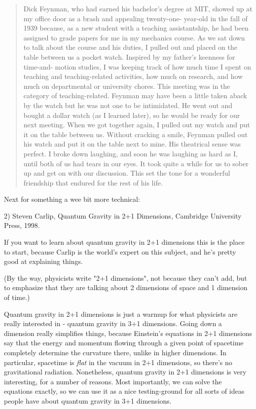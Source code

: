 \begin{quote}
     Dick Feynman, who had earned his bachelor's degree at MIT, 
     showed up at my office door as a brash and appealing twenty-one-
     year-old in the fall of 1939 because, as a new student with a
     teaching assistantship, he had been assigned to grade papers for
     me in my mechanics course.  As we sat down to talk about the course 
     and his duties, I pulled out and placed on the table between us
     a pocket watch.  Inspired by my father's keenness for time-and-
     motion studies, I was keeping track of how much time I spent on 
     teaching and teaching-related activities, how much on research, 
     and how much on departmental or university chores.  This meeting
     was in the category of teaching-related.  Feynman may have been 
     a little taken aback by the watch but he was not one to be 
     intimidated.  He went out and bought a dollar watch (as I learned
     later), so he would be ready for our next meeting.  When we got
     together again, I pulled out my watch and put it on the table 
     between us.  Without cracking a smile, Feynman pulled out his
     watch and put it on the table next to mine.  His theatrical sense
     was perfect.  I broke down laughing, and soon he was laughing as
     hard as I, until both of us had tears in our eyes.  It took quite
     a while for us to sober up and get on with our discussion.  This 
     set the tone for a wonderful friendship that endured for the rest
     of his life.
     
\end{quote}
Next for something a wee bit more technical:
    
2) Steven Carlip, Quantum Gravity in 2+1 Dimensions, Cambridge 
University Press, 1998.

If you want to learn about quantum gravity in 2+1 dimensions this is
the place to start, because Carlip is the world's expert on this subject, 
and he's pretty good at explaining things.  
 
(By the way, physicists write "2+1 dimensions", not because they can't
add, but to emphasize that they are talking about 2 dimensions of space
and 1 dimension of time.)
 
Quantum gravity in 2+1 dimensions is just a warmup for what physicists 
are really interested in - quantum gravity in 3+1 dimensions.   Going 
down a dimension really simplifies things, because Einstein's equations 
in 2+1 dimensions say that the energy and momentum flowing through a 
given point of spacetime completely determine the curvature there, 
unlike in higher dimensions.  In particular, spacetime is \emph{flat}
in the vacuum in 2+1 dimensions, so there's no gravitational radiation. 
Nonetheless, quantum gravity in 2+1 dimensions is very interesting, for
a number of reasons.  Most importantly, we can solve the equations
exactly, so we can use it as a nice testing-ground for all sorts of
ideas people have about quantum gravity in 3+1 dimensions.   

